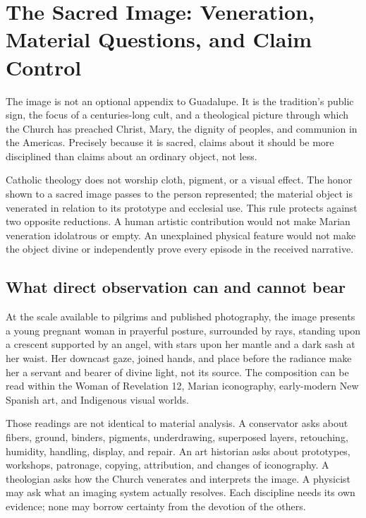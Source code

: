 \section{The Sacred Image: Veneration, Material Questions, and Claim Control}

The image is not an optional appendix to Guadalupe. It is the tradition's public sign, the focus of a centuries-long cult, and a theological picture through which the Church has preached Christ, Mary, the dignity of peoples, and communion in the Americas. Precisely because it is sacred, claims about it should be more disciplined than claims about an ordinary object, not less.

Catholic theology does not worship cloth, pigment, or a visual effect. The honor shown to a sacred image passes to the person represented; the material object is venerated in relation to its prototype and ecclesial use. This rule protects against two opposite reductions. A human artistic contribution would not make Marian veneration idolatrous or empty. An unexplained physical feature would not make the object divine or independently prove every episode in the received narrative.

\subsection{What direct observation can and cannot bear}

At the scale available to pilgrims and published photography, the image presents a young pregnant woman in prayerful posture, surrounded by rays, standing upon a crescent supported by an angel, with stars upon her mantle and a dark sash at her waist. Her downcast gaze, joined hands, and place before the radiance make her a servant and bearer of divine light, not its source. The composition can be read within the Woman of Revelation 12, Marian iconography, early-modern New Spanish art, and Indigenous visual worlds.

Those readings are not identical to material analysis. A conservator asks about fibers, ground, binders, pigments, underdrawing, superposed layers, retouching, humidity, handling, display, and repair. An art historian asks about prototypes, workshops, patronage, copying, attribution, and changes of iconography. A theologian asks how the Church venerates and interprets the image. A physicist may ask what an imaging system actually resolves. Each discipline needs its own evidence; none may borrow certainty from the devotion of the others.

